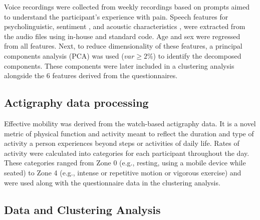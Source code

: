 \documentclass[conference]{IEEEtran}
\begin{document}
Voice recordings were collected from weekly recordings based on prompts aimed to understand the participant's experience with pain. Speech features for psycholinguistic, sentiment \cite{Pennebaker2015}, and acoustic characteristics \cite{Eyben2010}, \cite{DeJong2009} were extracted from the audio files using in-house and standard code. Age and sex were regressed from all features. Next, to reduce dimensionality of these features, a principal components analysis (PCA) was used ($var \geq 2\%$) to identify the decomposed components. These components were later included in a clustering analysis alongside the 6 features derived from the questionnaires.  

\subsection{Actigraphy data processing}

Effective mobility was derived from the watch-based actigraphy data. It is a novel metric of physical function and activity meant to reflect the duration and type of activity a person experiences beyond steps or activities of daily life. Rates of activity were calculated into categories for each participant throughout the day. These categories ranged from Zone 0 (e.g., resting, using a mobile device while seated) to Zone 4 (e.g., intense or repetitive motion or vigorous exercise) and were used along with the questionnaire data in the clustering analysis. 

\subsection{Data and Clustering Analysis}
\end{document}
